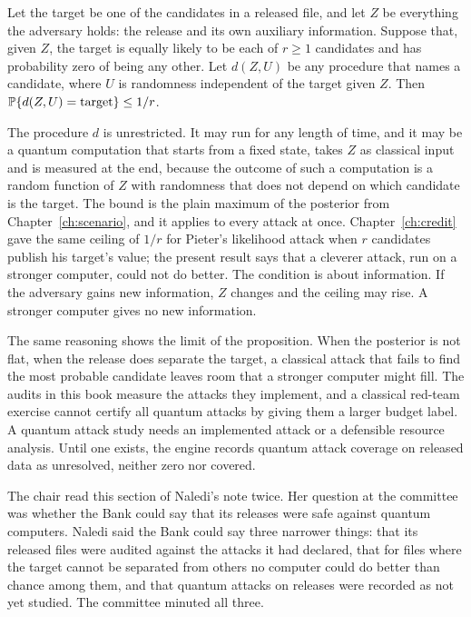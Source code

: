 \begin{proposition}\label{c21:prop-info}
Let the target be one of the candidates in a released file, and let $Z$ be everything the adversary
holds: the release and its own auxiliary information. Suppose that, given $Z$, the target is equally
likely to be each of $r\ge1$ candidates and has probability zero of being any other. Let $d(Z,U)$ be any
procedure that names a candidate, where $U$ is randomness independent of the target given $Z$. Then
$\mathbb{P}\{d(Z,U)=\text{target}\}\le1/r$.
\end{proposition}

The procedure $d$ is unrestricted. It may run for any length of time, and it may be a quantum
computation that starts from a fixed state, takes $Z$ as classical input and is measured at the end,
because the outcome of such a computation is a random function of $Z$ with randomness that does not
depend on which candidate is the target. The bound is the plain maximum of the posterior from
Chapter~\ref{ch:scenario}, and it applies to every attack at once. Chapter~\ref{ch:credit} gave the same ceiling of $1/r$
for Pieter's likelihood attack when $r$ candidates publish his target's value; the present result says
that a cleverer attack, run on a stronger computer, could not do better. The condition is about
information. If the adversary gains new information, $Z$ changes and the ceiling may rise. A
stronger computer gives no new information.

The same reasoning shows the limit of the proposition. When the posterior is not flat, when the
release does separate the target, a classical attack that fails to find the most probable
candidate leaves room that a stronger computer might fill. The audits in this book measure the
attacks they implement, and a classical red-team exercise cannot certify all quantum attacks by
giving them a larger budget label. A quantum attack study needs an implemented attack or a
defensible resource analysis. Until one exists, the engine records quantum attack coverage on
released data as unresolved, neither zero nor covered.

The chair read this section of Naledi's note twice. Her question at the committee was whether the
Bank could say that its releases were safe against quantum computers. Naledi said the Bank could
say three narrower things: that its released files were audited against the attacks it had
declared, that for files where the target cannot be separated from others no computer could do
better than chance among them, and that quantum attacks on releases were recorded as not yet
studied. The committee minuted all three.

